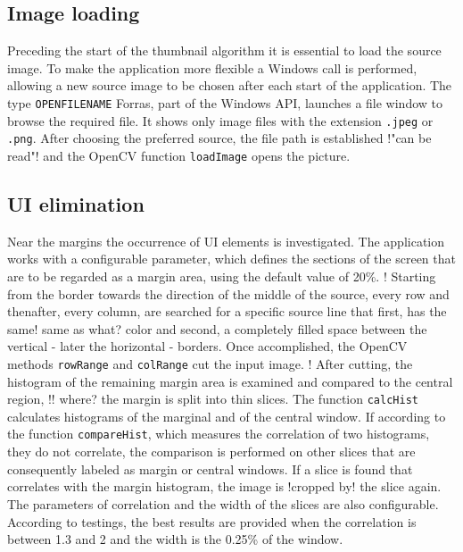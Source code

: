\documentclass[draft,final]{vutinfth} %
\begin{document}
	\subsection{Image loading}
	Preceding the start of the thumbnail algorithm it is essential to load the source image.
	To make the application more flexible a Windows call is performed, allowing a new source image to be chosen after each start of the application.
	The type \texttt{OPENFILENAME} Forras, part of the Windows API, launches a file window to browse the required file.
	It shows only image files with the extension \texttt{.jpeg} or \texttt{.png}.
	After choosing the preferred source, the file path is established !"can be read"! and the OpenCV function \texttt{loadImage} opens the picture.
	
	\subsection{UI elimination}
	Near the margins the occurrence of UI elements is investigated.
	The application works with a configurable parameter, which defines the sections of the screen that are to be regarded as a margin area, using the default value of 20\%. 
	! Starting from the border towards the direction of the middle of the source, every row and thenafter, every column, are searched for a specific source line that first, has the same! same as what? color and second, a completely filled space between the vertical - later the horizontal - borders.
	Once accomplished, the OpenCV methods \texttt{rowRange} and \texttt{colRange} cut the input image.
	! After cutting, the histogram of the remaining margin area is examined and compared to the central region, !! where? the margin is split into thin slices.
	The function \texttt{calcHist} calculates histograms of the marginal and of the central window.
	If according to the function \texttt{compareHist}, which measures the correlation of two histograms,%
	they do not correlate, the comparison is performed on other slices that are consequently labeled as margin or central windows.
	If a slice is found that correlates with the margin histogram, the image is !cropped by! the slice again. 
	The parameters of correlation and the width of the slices are also configurable.
	According to testings, the best results are provided when the correlation is between 1.3 and 2 and the width is the 0.25\% of the window.
	
\end{document}
